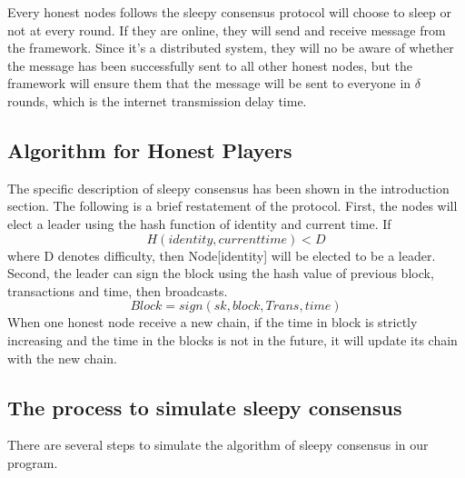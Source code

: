 \documentclass{llncs}
\begin{document}
Every honest nodes follows the sleepy consensus protocol will choose to sleep or not at every round. If they are online, they will send and receive message from the framework. Since it's a distributed system, they will no be aware of whether the message has been successfully sent to all other honest nodes, but the framework will ensure them that the message will be sent to everyone in $\delta $ rounds, which is the internet transmission delay time.

\subsection{Algorithm for Honest Players}
\quad The specific description of sleepy consensus has been shown in the introduction section. The following is a brief restatement of the protocol.
First, the nodes will elect a leader using the hash function of identity and current time. If
		 $$H(identity, current time) < D$$
		 where D denotes difficulty, then Node[identity] will be elected to be a leader.\\
Second, the leader can sign the block using the hash value of previous block, transactions and time, then broadcasts.
		 $$Block = sign(sk, block, Trans, time)$$
When one honest node receive a new chain, if the time in block is strictly increasing and the time in the blocks is not in the future, it will update its chain with the new chain.	
\subsection{The process to simulate sleepy consensus}
\quad There are several steps to simulate the algorithm of sleepy consensus in our program.
\end{document}
